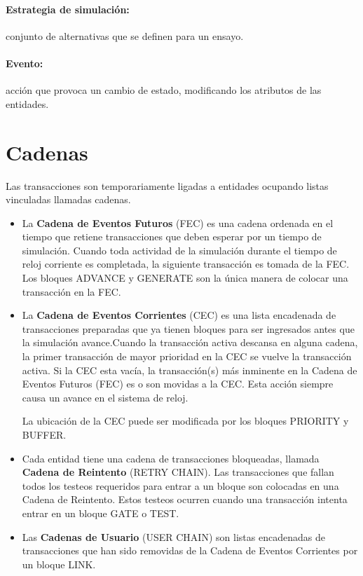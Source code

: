 \documentclass[12pt, a4paper, twoside]{paquetes-apunte/apunte}
\begin{document}
\paragraph{Estrategia de simulación:} conjunto de alternativas que se
definen para un ensayo.

\paragraph{Evento:} acción que provoca un cambio de estado, modificando
los atributos de las entidades.


\section{Cadenas}

Las transacciones son temporariamente ligadas a entidades ocupando
listas vinculadas llamadas cadenas.
\begin{itemize}
  \item La \textbf{Cadena de Eventos Futuros }(FEC) es una cadena ordenada
    en el tiempo que retiene transacciones que deben esperar por un tiempo
    de simulación. Cuando toda actividad de la simulación durante el tiempo
    de reloj corriente es completada, la siguiente transacción es tomada
    de la FEC. Los bloques ADVANCE y GENERATE son la única manera de colocar
    una transacción en la FEC.


  \item La \textbf{Cadena de Eventos Corrientes} (CEC) es una lista encadenada
    de transacciones preparadas que ya tienen bloques para ser ingresados
    antes que la simulación avance.Cuando la transacción activa descansa
    en alguna cadena, la primer transacción de mayor prioridad en la CEC
    se vuelve la transacción activa. Si la CEC esta vacía, la transacción(s)
    más inminente en la Cadena de Eventos Futuros (FEC) es o son movidas
    a la CEC. Esta acción siempre causa un avance en el sistema de reloj.

    La ubicación de la CEC puede ser modificada por los bloques PRIORITY
    y BUFFER.

  \item Cada entidad tiene una cadena de transacciones bloqueadas, llamada
    \textbf{Cadena de Reintento} (RETRY CHAIN). Las transacciones que
    fallan todos los testeos requeridos para entrar a un bloque son colocadas
    en una Cadena de Reintento. Estos testeos ocurren cuando una transacción
    intenta entrar en un bloque GATE o TEST.

  \item Las \textbf{Cadenas de Usuario} (USER CHAIN) son listas encadenadas
    de transacciones que han sido removidas de la Cadena de Eventos Corrientes
    por un bloque LINK.
\end{itemize}
\end{document}
